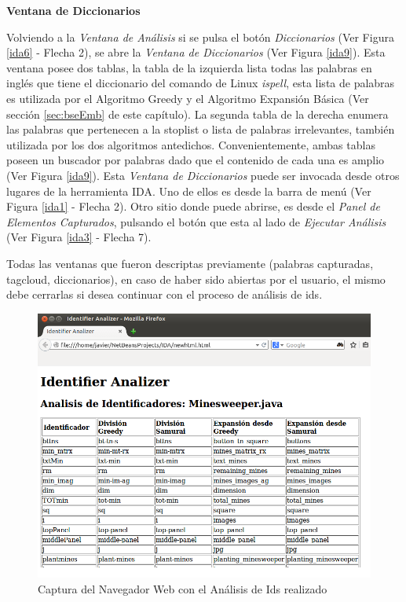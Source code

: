 \noindent \textbf{Ventana de Diccionarios\\} 

Volviendo a la \textit{Ventana de Análisis} si se pulsa el botón \textit{Diccionarios} (Ver Figura \ref{ida6} - Flecha 2), se abre la \textit{Ventana de Diccionarios} (Ver Figura \ref{ida9}). Esta ventana posee dos tablas, la tabla de la izquierda lista todas las palabras en inglés que tiene el diccionario del comando de Linux \textit{ispell}, esta lista de palabras es utilizada por el Algoritmo Greedy y el Algoritmo Expansión Básica (Ver sección \ref{sec:bseEmb} de este capítulo). La segunda tabla de la derecha enumera las palabras que pertenecen a la stoplist o lista de palabras irrelevantes, también utilizada por los dos algoritmos antedichos. Convenientemente, ambas tablas poseen un buscador por palabras dado que el contenido de cada una es amplio (Ver Figura \ref{ida9}). Esta \textit{Ventana de Diccionarios} puede ser invocada desde otros lugares de la herramienta IDA. Uno de ellos es desde la barra de menú (Ver Figura \ref{ida1} - Flecha 2). Otro sitio donde puede abrirse, es desde el \textit{Panel de Elementos Capturados}, pulsando el botón que esta al lado de \textit{Ejecutar Análisis} (Ver Figura \ref{ida3} - Flecha 7).

Todas las ventanas que fueron descriptas previamente (palabras capturadas, tagcloud, diccionarios), en caso de haber sido abiertas por el usuario, el mismo debe cerrarlas si desea continuar con el proceso de análisis de ids.


\begin{figure}[t!] %
\centerline{%
\includegraphics[scale= 0.63]{./cap4/ida_11.png}
}
\caption{Captura del Navegador Web con el Análisis de Ids realizado}
\label{ida11}
\end{figure}

